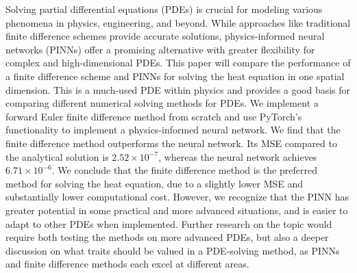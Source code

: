 Solving partial differential equations (PDEs) is crucial for modeling various phenomena in physics, engineering, and beyond.
While approaches like traditional finite difference schemes provide accurate solutions, physics-informed neural networks (PINNs) offer a promising alternative with greater flexibility for complex and high-dimensional PDEs.
This paper will compare the performance of a finite difference scheme and PINNs for solving the heat equation in one spatial dimension.
This is a much-used PDE within physics and provides a good basis for comparing different numerical solving methods for PDEs.
We implement a forward Euler finite difference method from scratch and use PyTorch's functionality to implement a physics-informed neural network.
We find that the finite difference method outperforms the neural network. 
Its MSE compared to the analytical solution is $2.52 \times 10^{-7}$, whereas the neural network achieves $ 6.71 \times 10^{-6}$. 
We conclude that the finite difference method is the preferred method for solving the heat equation, due to a slightly lower MSE and substantially lower computational cost.
However, we recognize that the PINN has greater potential in some practical and more advanced situations, and is easier to adapt to other PDEs when implemented.
Further research on the topic would require both testing the methods on more advanced PDEs, but also a deeper discussion on what traits should be valued in a PDE-solving method, as PINNs and finite difference methods each excel at different areas.